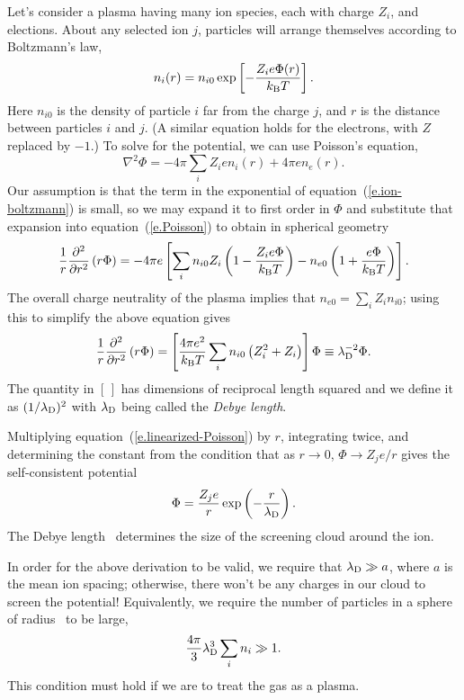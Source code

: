 Let's consider a plasma having many ion species, each with charge $Z_{i}$, and elections. About any selected ion $j$,  particles will arrange themselves according to Boltzmann's law,
\begin{equation}\label{e.ion-boltzmann}
n_{i}(r) = n_{i0}\exp\left[-\frac{Z_{i}e\Phi(r)}{k_\mathrm{B} T}\right].
\end{equation}
Here $n_{i0}$ is the density of particle $i$ far from the charge $j$, and $r$ is the distance between particles $i$ and $j$.  (A similar equation holds for the electrons, with $Z$ replaced by $-1$.) To solve for the potential, we can use Poisson's equation,
\begin{equation}\label{e.Poisson}
\nabla^{2}\Phi = -4\pi \sum_{i} Z_{i}e n_{i}(r) +4\pi e n_{e}(r).
\end{equation}
Our assumption is that the term in the exponential of equation~(\ref{e.ion-boltzmann}) is small, so we may expand it to first order in $\Phi$ and substitute that expansion into equation~(\ref{e.Poisson}) to obtain in spherical geometry
\[
 \frac{1}{r}\frac{\partial^{2}}{\partial r^{2}}\left(r\Phi\right) = -4\pi e \left[\sum_{i} n_{i0}Z_{i}\left(1-\frac{Z_{i}e\Phi}{k_\mathrm{B} T}\right) - n_{e0}\left(1 + \frac{e\Phi}{k_\mathrm{B} T}\right)\right].
\]
The overall charge neutrality of the plasma implies that $n_{e0} = \sum_{i}Z_{i}n_{i0}$; using this to simplify the above equation gives
\begin{equation}\label{e.linearized-Poisson}
\frac{1}{r}\frac{\partial^{2}}{\partial r^{2}}\left(r\Phi\right) = \left[\frac{4\pi e^{2}}{k_\mathrm{B} T}\sum_{i} n_{i0}\left(Z_{i}^{2}+Z_{i}\right)\right]\Phi \equiv \lambda_{\mathrm{D}}^{-2}\Phi.
\end{equation}
The quantity in $[\, ]$ has dimensions of reciprocal length squared and we define it as $(1/\lambda_{\mathrm{D}})^{2}$ with $\lambda_{\mathrm{D}}$ being called the \emph{Debye length}.

Multiplying equation~(\ref{e.linearized-Poisson}) by $r$, integrating twice, and determining the constant from the condition that as $r\to 0$, $\Phi \to Z_{j}e/r$ gives the self-consistent potential
\begin{equation}\label{e.screened-potential}
\Phi = \frac{Z_{j}e}{r}\exp\left(-\frac{r}{\lambda_{\mathrm{D}}}\right).
\end{equation}
The Debye length \lambdaD\ determines the size of the screening cloud around the ion.

In order for the above derivation to be valid, we require that $\lambda_{\mathrm{D}} \gg a$, where $a$ is the mean ion spacing; otherwise, there won't be any charges in our cloud to screen the potential! Equivalently, we require the number of particles in a sphere of radius \lambdaD\ to be large,
\begin{equation}\label{e.plasma-parameter}
\frac{4\pi}{3}\lambda_{\mathrm{D}}^{3} \sum_{i} n_{i} \gg 1.
\end{equation}
This condition must hold if we are to treat the gas as a plasma.

